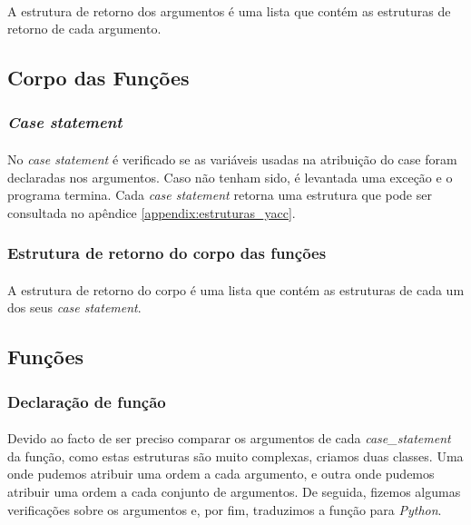 \documentclass[11pt,a4paper]{report}
\begin{document}
\paragraph*{}
A estrutura de retorno dos argumentos é uma lista que contém as estruturas de retorno de cada argumento.

\subsection{Corpo das Funções}
\subsubsection{\textit{Case statement}}
\paragraph*{}
No \textit{case statement} é verificado se as variáveis usadas na atribuição do case foram declaradas nos argumentos. Caso não tenham sido, é levantada uma exceção e o programa termina. Cada \textit{case statement} retorna uma estrutura que pode ser consultada no apêndice \ref{appendix:estruturas_yacc}.

\subsubsection{Estrutura de retorno do corpo das funções}
\paragraph*{}
A estrutura de retorno do corpo é uma lista que contém as estruturas de cada um dos seus \textit{case statement}.

\subsection{Funções}

\subsubsection{Declaração de função}
\paragraph*{}
Devido ao facto de ser preciso comparar os argumentos de cada \textit{case\_statement} da função, como estas estruturas são muito complexas, criamos duas classes. Uma onde pudemos atribuir uma ordem a cada argumento, e outra onde pudemos atribuir uma ordem a cada conjunto de argumentos. De seguida, fizemos algumas verificações sobre os argumentos e, por fim, traduzimos a função para \textit{Python}.
\end{document}
